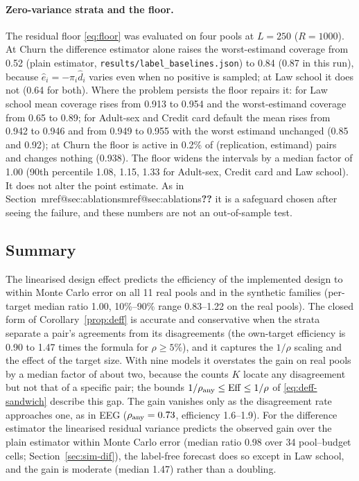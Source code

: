 \documentclass[pdflatex,sn-mathphys-num,iicol]{sn-jnl}
\makeatletter
\theoremstyle{thmstyleone}
\theoremstyle{thmstyletwo}
\theoremstyle{thmstylethree}
\newcommand{\Mref}[1]{\ifcsname mref@#1\endcsname\csname mref@#1\endcsname\else\textbf{??}\fi}
\makeatother
\begin{document}
\paragraph{Zero-variance strata and the floor.} The residual floor \eqref{eq:floor} was evaluated on four pools at $L=250$ ($R=1000$). At Churn the difference estimator alone raises the worst-estimand coverage from 0.52 (plain estimator, \texttt{results/label\_baselines.json}) to 0.84 (0.87 in this run), because
$\hat e_i=-\pi_i\hat d_i$ varies even when no positive is sampled; at Law school it does not (0.64 for both). Where the problem persists the floor repairs it: for Law school mean coverage rises from 0.913 to 0.954 and the worst-estimand coverage from 0.65 to 0.89; for Adult-sex and Credit card default the mean rises from 0.942 to 0.946 and from 0.949 to 0.955 with the worst estimand unchanged (0.85 and 0.92); at Churn the floor is active in 0.2\% of
(replication, estimand) pairs and changes nothing (0.938). The floor widens the intervals by a median factor of 1.00 (90th percentile 1.08, 1.15, 1.33 for Adult-sex, Credit card and Law school). It does not alter the point estimate. As in Section~\Mref{sec:ablations} it is a safeguard chosen after seeing the failure, and these numbers are not an out-of-sample test.

\subsection{Summary}

The linearised design effect predicts the efficiency of the implemented design to within Monte
Carlo error on all 11 real pools and in the synthetic families (per-target median ratio 1.00,
10\%--90\% range 0.83--1.22 on the real pools). The closed form of Corollary~\ref{prop:deff} is
accurate and conservative when the strata separate a pair's agreements from its disagreements (the
own-target efficiency is 0.90 to 1.47 times the formula for $\rho\ge5\%$), and it captures the $1/\rho$ scaling and the effect of the
target size. With nine models it overstates the gain on real pools by a median factor of about two,
because the counts $K$ locate any disagreement but not that of a specific pair; the bounds
$1/\rho_{\rm any}\le\mathrm{Eff}\le1/\rho$ of \eqref{eq:deff-sandwich} describe this gap. The gain vanishes
only as the disagreement rate approaches one, as in EEG ($\rho_{\rm any}=0.73$, efficiency 1.6--1.9). For the difference estimator the linearised residual variance predicts the observed gain over the plain estimator within Monte Carlo error
(median ratio 0.98 over 34 pool--budget cells; Section~\ref{sec:sim-dif}), the label-free forecast does so except in Law school, and the gain is moderate (median 1.47) rather than a doubling.
\end{document}
